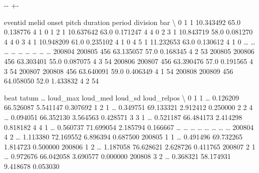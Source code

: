 \documentclass[letterpaper,10pt,english]{sphinxmanual}
\newlength\nbsphinxcodecellspacing
\begin{document}
{

\kern-\sphinxverbatimsmallskipamount\kern-\baselineskip
\kern+\FrameHeightAdjust\kern-\fboxrule
\vspace{\nbsphinxcodecellspacing}

\begin{sphinxVerbatim}[commandchars=\\\{\}]
\llap{\color{nbsphinxout}[44]:\,\hspace{\fboxrule}\hspace{\fboxsep}}        eventid  melid      onset  pitch  duration  period  division  bar  \textbackslash{}
0             1      1  10.343492   65.0  0.138776       4         1    0
1             2      1  10.637642   63.0  0.171247       4         4    0
2             3      1  10.843719   58.0  0.081270       4         4    0
3             4      1  10.948209   61.0  0.235102       4         1    0
4             5      1  11.232653   63.0  0.130612       4         1    0
{\ldots}         {\ldots}    {\ldots}        {\ldots}    {\ldots}       {\ldots}     {\ldots}       {\ldots}  {\ldots}
200804   200805    456  63.135057   57.0  0.168345       4         2   53
200805   200806    456  63.303401   55.0  0.087075       4         3   54
200806   200807    456  63.390476   57.0  0.191565       4         3   54
200807   200808    456  63.640091   59.0  0.406349       4         1   54
200808   200809    456  64.058050   52.0  1.433832       4         2   54

        beat  tatum  {\ldots}  loud\_max   loud\_med   loud\_sd loud\_relpos  \textbackslash{}
0          1      1  {\ldots}  0.126209  66.526087  5.541147    0.307692
1          2      1  {\ldots}  0.349751  69.133321  2.912412    0.250000
2          2      4  {\ldots}  0.094051  66.352130  3.564563    0.428571
3          3      1  {\ldots}  0.521187  66.484173  2.414298    0.818182
4          4      1  {\ldots}  0.560737  71.699054  2.185794    0.166667
{\ldots}      {\ldots}    {\ldots}  {\ldots}       {\ldots}        {\ldots}       {\ldots}         {\ldots}
200804     4      2  {\ldots}  1.113380  72.169552  6.896394    0.687500
200805     1      1  {\ldots}  0.491496  69.732265  1.814723    0.500000
200806     1      2  {\ldots}  1.187058  76.628621  2.628726    0.411765
200807     2      1  {\ldots}  0.972676  66.042058  3.690577    0.000000
200808     3      2  {\ldots}  0.368321  58.174931  9.418678    0.053030


\end{sphinxVerbatim}}
\end{document}
